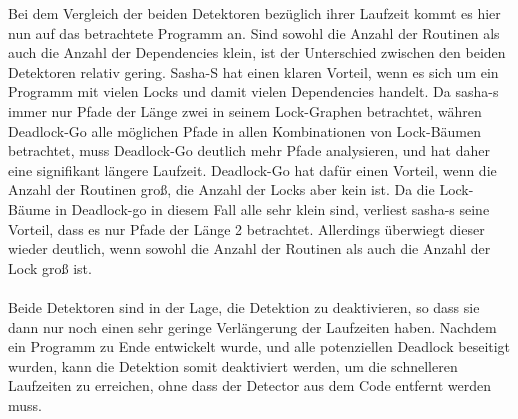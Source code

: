 Bei dem Vergleich der beiden Detektoren bezüglich ihrer 
Laufzeit kommt es hier nun auf das betrachtete Programm an. Sind sowohl die Anzahl 
der Routinen als auch die Anzahl der Dependencies klein, ist der Unterschied
zwischen den beiden Detektoren relativ gering. Sasha-S hat einen klaren 
Vorteil, wenn es sich um ein Programm mit vielen Locks und damit vielen 
Dependencies handelt. Da sasha-s immer nur Pfade der Länge zwei in seinem 
Lock-Graphen betrachtet, 
währen Deadlock-Go alle möglichen Pfade in allen Kombinationen von Lock-Bäumen betrachtet, 
muss Deadlock-Go deutlich mehr Pfade analysieren, und hat daher eine signifikant
längere Laufzeit.
Deadlock-Go hat dafür einen Vorteil, wenn die Anzahl der 
Routinen groß, die Anzahl der Locks aber kein ist. Da die Lock-Bäume in Deadlock-go
in diesem Fall alle sehr klein sind, verliest sasha-s seine Vorteil, dass 
es nur Pfade der Länge 2 betrachtet. Allerdings überwiegt dieser wieder 
deutlich, wenn sowohl die Anzahl der Routinen als auch die Anzahl der Lock groß
ist.\\ \\
Beide Detektoren sind in der Lage, die Detektion zu deaktivieren, so dass sie dann nur noch einen
sehr geringe Verlängerung der Laufzeiten haben. Nachdem ein Programm zu Ende entwickelt
wurde, und alle potenziellen Deadlock beseitigt wurden, kann die Detektion somit deaktiviert
werden, um die schnelleren Laufzeiten zu erreichen, ohne dass der Detector aus dem Code entfernt
werden muss.